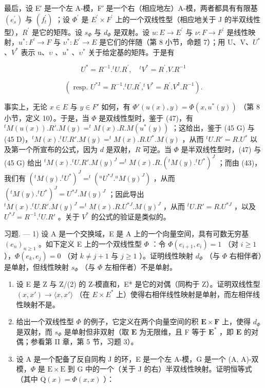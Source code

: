 最后，设 E′ 是一个左 A-模，F′ 是一个右（相应地左）A-模，两者都具有有限基 \((e_{s}^{\prime})\) 与 \((f_{t}^{\prime})\) ；设 \(\Phi^{\prime}\) 是 \(E^{\prime} \times F^{\prime}\) 上的一个双线性型（相应地关于 J 的半双线性型），\(R^{\prime}\) 是它的矩阵。设 \(s_{\Phi}\) 与 \(d_{\Phi}\) 是双射。设 \(u : E \to E^{\prime}\) 与 \(\nu : F \to F^{\prime}\) 是线性映射，\(u^{*} : F^{\prime} \to F\) 与 \(\upsilon^{*} : E^{\prime} \to E\) 是它们的伴随（第 8 小节，命题 7）；用 U、V、\(U^{*}\) 、\(V^{*}\) 表示 u、\(\upsilon\) 、\(u^{*}\) 、\(\upsilon^{*}\) 关于给定基的矩阵。于是有

\[
U ^ {*} = R ^ {- 1}. ^ {t} U. R ^ {\prime}, \quad {} ^ {t} V ^ {*} = R ^ {\prime}. V. R ^ {- 1}\tag{50}
\]

\[
(\text { resp. } U ^ {* \mathrm{J}} = R ^ {- 1}. ^ {t} U. R ^ {\prime}, ^ {t} V ^ {*} = R ^ {\prime}. V ^ {\mathrm{J}}. R ^ {- 1}).
\]

事实上，无论 \(x \in E\) 与 \(y \in F'\) 如何，有 \(\Phi'(u(x), y) = \Phi(x, u^*(y))\) （第 8 小节，定义 10）。于是，当 \(\Phi\) 是双线性型时，鉴于 (47)，有 \(^t M(u(x)). R'. M(y) = ^t M(x). R. M(u^*(y))\) ；这给出，鉴于 (45 G) 与 (45 D)，\(^t M(x). ^t U. R'. M(y) = ^t M(x). R. U^*. M(y)\) ，从而 \(^t U. R' = R. U^*\) 以及第一个所宣布的公式，因为 \(d\) 是双射，\(R\) 可逆。当 \(\Phi\) 是半双线性型时，(47) 与 (45 G) 给出 \(^t M(x). ^t U. R'. M(y)^J = ^t M(x). R. (^{t}M(y). ^{t}U^*)^{J}\) ；而由 (43)，我们有 \((^{t}M(y). ^{t}U^*)^{J} = ^{t}(^{u}U^{*J}. ^{u}M(y)^{J})\) ，从而 \((^{t}M(y). ^{t}U^*)^{J} = U^{*J}. M(y)^{J}\) ；因此导出 \(^t M(x). ^{t}U. R'. M(y)^{J} = ^{t}M(x). R. U^{*J}. M(y)^{J}\) ，从而 \(^t U. R' = R. U^{*J}\) ，以及 \(U^{*J} = R^{-1}. ^{t}U. R'\) 。关于 \(V^*\) 的公式的验证是类似的。

习题. --- 1) 设 A 是一个交换域，E 是 A 上的一个向量空间，具有可数无穷基 \((e_n)_{n \geqslant 1}\) 。如下定义 E 上的一个双线性型 \(\Phi\) ：令 \(\Phi(e_{i+1}, e_i) = 1\) （对 \(i \geqslant 1\) ），\(\Phi(e_k, e_j) = 0\) （对 \(k \neq j + 1\) 与 \(j \geqslant 1\) ）。证明线性映射 \(d_\Phi\) （与 \(\Phi\) 右相伴者）是单射，但线性映射 \(s_\Phi\) （与 \(\Phi\) 左相伴者）不是单射。

\begin{enumerate}
\def\labelenumi{\arabic{enumi})}
\setcounter{enumi}{1}
\item
  设 E 是 Z 与 Z/(2) 的 Z-模直和，E* 是它的对偶（同构于 Z）。证明双线性型 \((x, x') \to \langle x, x' \rangle\) （在 \(E \times E^*\) 上）使得右相伴线性映射是单射，而左相伴线性映射不是。
\item
  给出一个双线性型 \(\Phi\) 的例子，它定义在两个向量空间的积 \(\mathbf{E} \times \mathbf{F}\) 上，使得 \(d_{\Phi}\) 是双射，而 \(s_{\Phi}\) 是单射但非双射（取 \(\mathbf{E}\) 为无限维，且 F 等于 \(\mathbf{E}^*\) ，即 \(\mathbf{E}\) 的对偶；参看第 II 章，第 5 节，习题 3）。
\item
  设 A 是一个配备了反自同构 J 的环，E 是一个左 A-模，G 是一个 (A, A)-双模，\(\Phi\) 是 \(\mathrm{E} \times \mathrm{E}\) 到 G 中的一个（关于 J 的右）半双线性映射。证明恒等式（其中 \(\mathrm{Q}(x) = \Phi(x, x)\) ）：
\end{enumerate}

